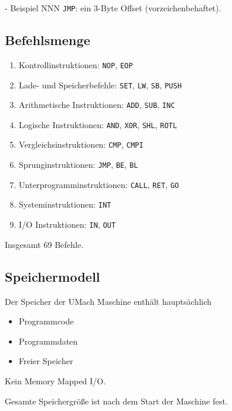 \begin{frame}{\insertsubsection{} - Beispiel NNN}
 \texttt{JMP}: ein 3-Byte Offset (vorzeichenbehaftet).
 \begin{center}
  
 \end{center}
\end{frame}

\subsection{Befehlsmenge}

\begin{frame}{\insertsubsection}
\begin{enumerate}
  \item Kontrollinstruktionen: \texttt{NOP}, \texttt{EOP}
  \item Lade- und Speicherbefehle: 
        \texttt{SET}, \texttt{LW}, \texttt{SB}, \texttt{PUSH}
  \item Arithmetische Instruktionen:
        \texttt{ADD}, \texttt{SUB}, \texttt{INC}
  \item Logische Instruktionen:
        \texttt{AND}, \texttt{XOR}, \texttt{SHL}, \texttt{ROTL}
  \item Vergleichsinstruktionen:
        \texttt{CMP}, \texttt{CMPI}
  \item Sprunginstruktionen:
        \texttt{JMP}, \texttt{BE}, \texttt{BL}
  \item Unterprogramminstruktionen:
        \texttt{CALL}, \texttt{RET}, \texttt{GO}
  \item Systeminstruktionen:
        \texttt{INT}
  \item I/O Instruktionen:
        \texttt{IN}, \texttt{OUT}
\end{enumerate}
Insgesamt 69 Befehle.
\end{frame}



\subsection{Speichermodell}

\begin{frame}{\insertsubsection}
 Der Speicher der UMach Maschine enthält hauptsächlich
 \begin{itemize}
  \item Programmcode
  \item Programmdaten
  \item Freier Speicher
 \end{itemize}
  Kein Memory Mapped I/O.
  
  Gesamte Speichergröße ist nach dem Start der Maschine fest.
\end{frame}


